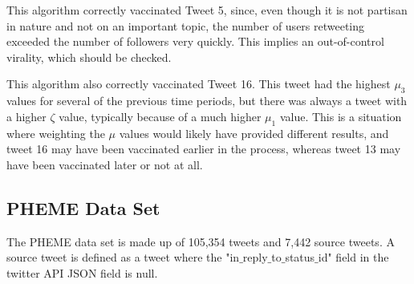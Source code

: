 \documentclass[preprint,review,12pt]{elsarticle}
\begin{document}
This algorithm correctly vaccinated Tweet 5, since, even though it is not partisan in nature and not on an important topic, the number of users retweeting exceeded the number of followers very quickly. This implies an out-of-control virality, which should be checked.

This algorithm also correctly vaccinated Tweet 16. This tweet had the highest $\mu_3$ values for several of the previous time periods, but there was always a tweet with a higher $\zeta$ value, typically because of a much higher $\mu_1$ value. This is a situation where weighting the $\mu$ values would likely have provided different results, and tweet 16 may have been vaccinated earlier in the process, whereas tweet 13 may have been vaccinated later or not at all. 



\subsection{PHEME Data Set}
The PHEME data set is made up of 105,354 tweets and 7,442 source tweets. A source tweet is defined as a tweet where the "in$\_$reply$\_$to$\_$status$\_$id" field in the twitter API JSON field is null. 
\end{document}
